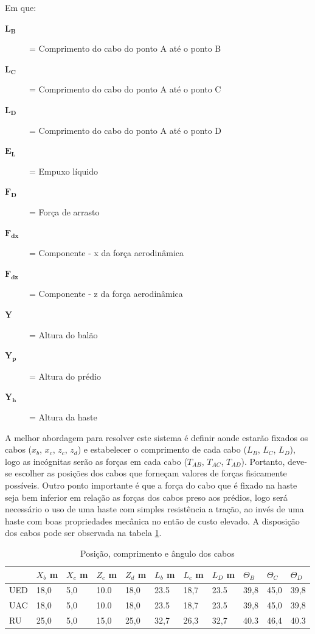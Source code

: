 	Em que:
	\begin{description}
		\item[$\boldsymbol{L_{B}}$] = Comprimento do cabo do ponto A até o ponto B
		\item[$\boldsymbol{L_{C}}$] = Comprimento do cabo do ponto A até o ponto C
		\item[$\boldsymbol{L_{D}}$] = Comprimento do cabo do ponto A até o ponto D
		\item[$\boldsymbol{E_{L}}$] = Empuxo líquido
		\item[$\boldsymbol{F_{D}}$] = Força de arrasto
		\item[$\boldsymbol{F_{dx}}$] = Componente - x da força aerodinâmica
		\item[$\boldsymbol{F_{dz}}$] = Componente - z da força aerodinâmica
		\item[$\boldsymbol{Y}$] = Altura do balão
		\item[$\boldsymbol{Y_{p}}$] = Altura do prédio
		\item[$\boldsymbol{Y_{h}}$] = Altura da haste
	\end{description}

A melhor abordagem para resolver este sistema é definir aonde estarão fixados os cabos ($x_{b}$, $x_{c}$, $z_{c}$, $z_{d}$) e estabelecer o comprimento de cada cabo ($L_{B}$, $L_{C}$, $L_{D}$), logo as incógnitas serão as forças em cada cabo ($T_{AB}$, $T_{AC}$, $T_{AD}$). Portanto, deve-se escolher as posições dos cabos que forneçam valores de forças fisicamente possíveis. Outro ponto importante é que a força do cabo que é fixado na haste seja bem inferior em relação as forças dos cabos preso aos prédios, logo será necessário o uso de uma haste com simples resistência a tração, ao invés de uma haste com boas propriedades mecânica no então de custo elevado. A disposição dos cabos pode ser observada na tabela \ref{tab:composangcabos}.

\begin{table}[htp]
\centering
\caption{Posição, comprimento e ângulo dos cabos}
\begin{tabular}{l|l|l|l|l|l|l|l|l|l|l|}
\cline{2-11}
 & $X_{b}$ m & $X_{c}$ m & $Z_{c}$ m & $Z_{d}$ m & $L_{b}$ m & $L_{c}$ m & $L_{D}$ m & $\Theta _{B}$ & $\Theta _{C}$ & $\Theta _{D}$ \\ \hline
\multicolumn{1}{|l|}{UED} & 18,0 & 5,0 & 10.0 & 18,0 & 23.5 & 18,7 & 23.5 & 39,8 & 45,0 & 39,8 \\ \hline
\multicolumn{1}{|l|}{UAC} & 18,0 & 5,0 & 10.0 & 18,0 & 23.5 & 18,7 & 23.5 & 39,8 & 45,0 & 39,8 \\ \hline
\multicolumn{1}{|l|}{RU} & 25,0 & 5,0 & 15,0 & 25,0 & 32,7 & 26,3 & 32,7 & 40.3 & 46,4 & 40.3 \\ \hline
\end{tabular}
\label{tab:composangcabos}
\end{table}

